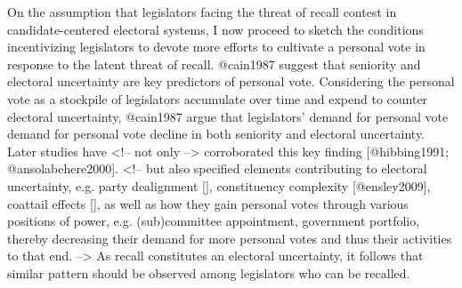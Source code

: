 \documentclass[hyphens, crop=false]{standalone}
\begin{document}
		On the assumption that legislators facing the threat of recall contest in candidate-centered electoral systems,
		I now proceed to sketch the conditions incentivizing legislators to devote more efforts to cultivate a personal vote in response to the latent threat of recall.
		@cain1987 suggest that seniority and electoral uncertainty are key predictors of personal vote.
		Considering the personal vote as a stockpile of legislators accumulate over time and expend to counter electoral uncertainty,
		@cain1987 argue that legislators' demand for personal vote demand for personal vote decline in both seniority and electoral uncertainty.
		Later studies have 
		<!-- not only  -->
		corroborated this key finding [@hibbing1991; @ansolabehere2000].
		<!-- but also specified elements contributing to electoral uncertainty, e.g. party dealignment [], constituency complexity [@ensley2009], coattail effects [], as well as how they gain personal votes through various positions of power, e.g. (sub)committee appointment, government portfolio, thereby decreasing their demand for more personal votes and thus their activities to that end.  -->
		As recall constitutes an electoral uncertainty, it follows that similar pattern should be observed among legislators who can be recalled.
	
\end{document}
